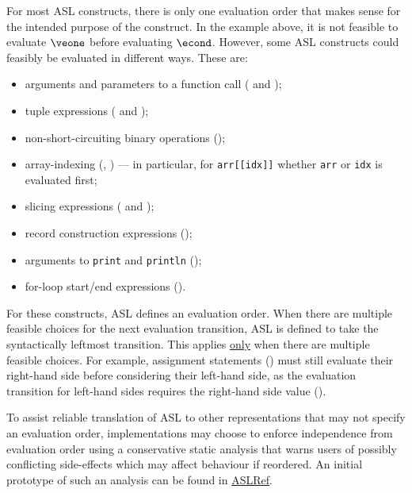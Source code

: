 For most ASL constructs, there is only one evaluation order that makes sense for the intended purpose of the construct.
In the example above, it is not feasible to evaluate $\veone$ before evaluating $\econd$.
However, some ASL constructs could feasibly be evaluated in different ways.
These are:
\begin{itemize}
  \item arguments and parameters to a function call ( and );
  \item tuple expressions ( and );
  \item non-short-circuiting binary operations ();
  \item array-indexing (, ) --- in particular, for \verb|arr[[idx]]| whether \verb|arr| or \verb|idx| is evaluated first;
  \item slicing expressions ( and );
  \item record construction expressions ();
  \item arguments to \verb|print| and \verb|println| ();
  \item for-loop start/end expressions ().
\end{itemize}

For these constructs, ASL defines an evaluation order.
When there are multiple feasible choices for the next evaluation transition, ASL is defined to take the syntactically leftmost transition.
This applies \underline{only} when there are multiple feasible choices.
For example, assignment statements () must still evaluate their right-hand side before considering their left-hand side, as the evaluation transition for left-hand sides requires the right-hand side value ().

To assist reliable translation of ASL to other representations that may not specify an evaluation order, implementations may choose to enforce independence from evaluation order using a conservative static analysis that warns users of possibly conflicting side-effects which may affect behaviour if reordered.
An initial prototype of such an analysis can be found in \href{https://github.com/herd/herdtools7/blob/\VERSION/asllib/SideEffect.ml}{ASLRef}.

